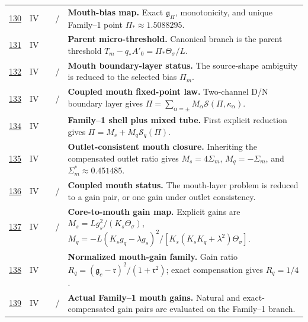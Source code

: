 {\begin{longtable}{@{}L{0.055\textwidth}L{0.075\textwidth}L{0.145\textwidth}L{0.235\textwidth}L{0.43\textwidth}@{}}
\addlinespace
\hyperref[stage:130]{130} & IV &  & \StatusExactClosure{} / \StatusNumerical{} & \textbf{Mouth-bias map.} Exact \(\mathfrak g_\Pi\), monotonicity, and unique Family--1 point \(\Pi_*\approx1.5088295\). \\
\addlinespace
\hyperref[stage:131]{131} & IV &  & \StatusExactClosure{} & \textbf{Parent micro-threshold.} Canonical branch is the parent threshold \(T_m-q_*A'_0=\Pi_*\Theta_\sigma/L\). \\
\addlinespace
\hyperref[stage:132]{132} & IV &  & \StatusExactClosure{} / \StatusOpen{} & \textbf{Mouth boundary-layer status.} The source-shape ambiguity is reduced to the selected bias \(\Pi_m\). \\
\addlinespace
\hyperref[stage:133]{133} & IV &  & \StatusExactClosure{} / \StatusReduced{} & \textbf{Coupled mouth fixed-point law.} Two-channel D/N boundary layer gives \(\Pi=\sum_{\alpha=\pm}M_\alpha\mathcal S(\Pi,\kappa_\alpha)\). \\
\addlinespace
\hyperref[stage:134]{134} & IV &  & \StatusExactClosure{} & \textbf{Family--1 shell plus mixed tube.} First explicit reduction gives \(\Pi=M_s+M_q\mathcal S_q(\Pi)\). \\
\addlinespace
\hyperref[stage:135]{135} & IV &  & \StatusExactClosure{} & \textbf{Outlet-consistent mouth closure.} Inheriting the compensated outlet ratio gives \(M_s=4\Sigma_m\), \(M_q=-\Sigma_m\), and \(\Sigma_m^*\approx0.451485\). \\
\addlinespace
\hyperref[stage:136]{136} & IV &  & \StatusExactClosure{} / \StatusOpen{} & \textbf{Coupled mouth status.} The mouth-layer problem is reduced to a gain pair, or one gain under outlet consistency. \\
\addlinespace
\hyperref[stage:137]{137} & IV &  & \StatusExactClosure{} / \StatusReduced{} & \textbf{Core-to-mouth gain map.} Explicit gains are \(M_s=Lg_s^2/(K_s\Theta_\sigma)\), \(M_q=-L(K_sg_q-\lambda g_s)^2/[K_s(K_sK_q+\lambda^2)\Theta_\sigma]\). \\
\addlinespace
\hyperref[stage:138]{138} & IV &  & \StatusExactClosure{} & \textbf{Normalized mouth-gain family.} Gain ratio \(R_q=(\mathfrak g_c-\mathfrak r)^2/(1+\mathfrak r^2)\); exact compensation gives \(R_q=1/4\). \\
\addlinespace
\hyperref[stage:139]{139} & IV &  & \StatusExactClosure{} / \StatusNumerical{} & \textbf{Actual Family--1 mouth gains.} Natural and exact-compensated gain pairs are evaluated on the Family--1 branch. \\

\end{longtable}}
